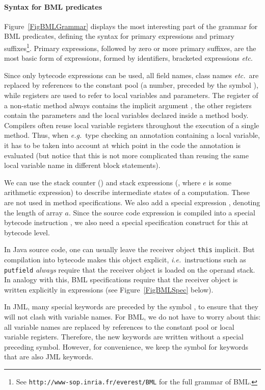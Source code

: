 \paragraph{Syntax for BML predicates}
Figure~\ref{FigBMLGrammar} displays the most interesting part of the
grammar for BML predicates, defining the
syntax for primary expressions and primary suffixes\footnote{See
\texttt{http://www-sop.inria.fr/everest/BML} for the full grammar of BML.}.
Primary expressions, followed by zero or more primary suffixes, are
the most basic form of expressions, formed by identifiers, bracketed
expressions \emph{etc}.

Since only bytecode expressions can be used, all field names, class
names \emph{etc.}\ are replaced by references to the constant pool (a
number, preceded by the symbol \codeHook{\#}), while registers are
used to refer to local variables and parameters. The register
 of a non-static method always contains the implicit
argument , the other registers contain the parameters
and the local variables declared inside a method body. Compilers often
reuse local variable registers throughout the execution of a single
method. Thus, when \emph{e.g.}\ type checking an annotation containing
a local variable, it has to be taken into account at which point in
the code the annotation is evaluated (but notice that this is not more
complicated than reusing the same local variable name in different
block statements).

We can use the stack counter () and stack expressions
(, where \(e\) is some arithmetic expression) to
describe intermediate states of a computation.  These are not used in
method specifications. We also add a special expression
, denoting the length of array \(a\). Since
the source code expression
 is compiled into a special bytecode
instruction , we also need a special
specification construct for this at bytecode level.

In Java source code, one can usually leave the receiver object
\texttt{this} implicit. But compilation into bytecode makes this
object explicit, \emph{i.e.}\ instructions such as \texttt{putfield}
\emph{always} require that the receiver object is loaded on the
operand stack. In analogy with this, BML specifications require that
the receiver object is written explicitly in expressions (see
Figure~\ref{FigBMLSpec} below). 

In JML, many special keywords are preceded by the symbol
\codeHook{\bsl}, to ensure that they will not clash with variable
names. For BML, we do not have to worry about this: all
variable names are replaced by references to the constant pool or
local variable registers. Therefore, the new keywords are written
without a special preceding symbol. However, for convenience, we keep
the symbol for keywords that are also JML keywords.

